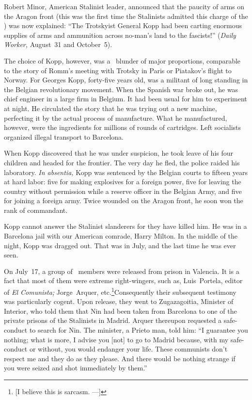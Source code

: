Robert Minor, American Stalinist leader, announced that the pau\-ci\-ty of arms on the Aragon front (this was the first time the Stalinists admitted this charge of the \CNT) was now explained: ``The Trotskyist General Kopp had been carting enormous supplies of arms and ammunition across no-man’s land to the fascists!'' (\emph{Daily Worker,} August~31 and October~5).

The choice of Kopp, however, was a \GPU\ blunder of major proportions, comparable to the story of Romm’s meeting with Trotsky in Paris or Piatakov’s flight to Norway. For Georges Kopp, forty-five years old, was a militant of long standing in the Belgian revolutionary movement. When the Spanish war broke out, he was chief engineer in a large firm in Belgium. It had been usual for him to experiment at night. He circulated the story that he was trying out a new machine, perfecting it by the actual process of manufacture. What he manufactured, however, were the ingredients for millions of rounds of cartridges. Left socialists organized illegal transport to Barcelona.

When Kopp discovered that he was under suspicion, he took leave of his four children and headed for the frontier. The very day he fled, the police raided his laboratory. \emph{In absentia,} Kopp was sentenced by the Belgian courts to fifteen years at hard labor: five for making explosives for a foreign power, five for leaving the country without permission while a reserve officer in the Belgian Army, and five for joining a foreign army. Twice wounded on the Aragon front, he soon won the rank of commandant.

Kopp cannot answer the Stalinist slanderers for they have killed him. He was in a Barcelona jail with our American comrade, Harry Milton. In the middle of the night, Kopp was dragged out. That was in July, and the last time he was ever seen.

On July~17, a group of \POUM\ members were released from prison in Valencia. It is a fact that most of them were extreme right-wingers, such as, Luis~Portela, editor of \emph{El Comunista;} Jorge~Arquer, etc.\footnote{[I believe this is sarcasm. ---\JCW]}\@ Consequently their subsequent testimony was particularly cogent. Upon release, they went to Zugazagoitia, Minister of Interior, who told them that Nin{\indexANin} had been taken from Barcelona to one of the private prisons of the Stalinists in Madrid. Arquer thereupon requested a safe-conduct to search for Nin. The minister, a Prieto man, told him: ``I guarantee you nothing; what is more, I advise you [not] to go to Madrid because, with my safe-conduct or without, you would endanger your life. These communists don’t respect me and they do as they please. And there would be nothing strange if you were seized and shot immediately by them.''

